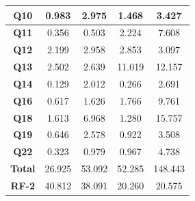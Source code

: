 \begin{table}[htpb]
\begin{tabular}{|c|c|c|c|c|}
        \hline
         \textbf{Q10}         & 0.983             & 2.975                         & 1.468             & 3.427                     \\ 
        \hline
         \textbf{Q11}         & 0.356             & 0.503                         & 2.224             & 7.608                     \\ 
        \hline
         \textbf{Q12}         & 2.199             & 2.958                         & 2.853             & 3.097                     \\ 
        \hline
         \textbf{Q13}         & 2.502             & 2.639                         & 11.019            & 12.157                    \\ 
        \hline
         \textbf{Q14}         & 0.129             & 2.012                         & 0.266             & 2.691                     \\ 
        \hline
         \textbf{Q16}         & 0.617             & 1.626                         & 1.766             & 9.761                     \\ 
        \hline
         \textbf{Q18}         & 1.613             & 6.968                         & 1.280             & 15.757                    \\ 
        \hline
         \textbf{Q19}         & 0.646             & 2.578                         & 0.922             & 3.508                     \\ 
        \hline
         \textbf{Q22}         & 0.323             & 0.979                         & 0.967             & 4.738                     \\ 
        \hline
         \textbf{Total}       & 26.925            & 53.092                        & 52.285            & 148.443                   \\ 
        \hline
         \textbf{RF-2}        & 40.812            & 38.091                        & 20.260            & 20.575                    \\
        \hline
        \end{tabular}
\end{table}

